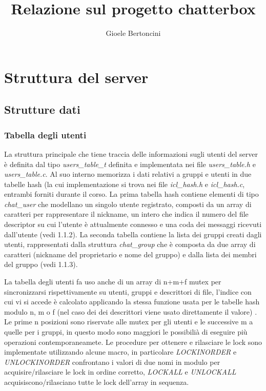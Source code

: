 \documentclass[11pt]{article}
\title{\textbf{Relazione sul progetto chatterbox}}
\author{Gioele Bertoncini}
\date{}
\begin{document}
\maketitle

\section{Struttura del server}
\subsection{Strutture dati}

\subsubsection{Tabella degli utenti}
La struttura principale che tiene traccia delle informazioni sugli utenti del server è definita dal tipo \emph{users\_table\_t} definita e implementata nei file \emph{users\_table.h} e \emph{users\_table.c}. Al suo interno memorizza i dati relativi a gruppi e utenti in due tabelle hash (la cui implementazione si trova nei file \emph{icl\_hash.h} e \emph{icl\_hash.c}, entrambi forniti durante il corso. La prima tabella hash contiene elementi di tipo \emph{chat\_user} che modellano un singolo utente registrato, composti da un array di caratteri per rappresentare il nickname, un intero che indica il numero del file descriptor su cui l'utente è attualmente connesso e una coda dei messaggi ricevuti dall'utente (vedi 1.1.2). La seconda tabella contiene la lista dei gruppi creati dagli utenti, rappresentati dalla struttura \emph{chat\_group} che è composta da due array di caratteri (nickname del proprietario e nome del gruppo) e dalla lista dei membri del gruppo (vedi 1.1.3).

La tabella degli utenti fa uso anche di un array di n+m+f mutex per sincronizzarsi rispettivamente su utenti, gruppi e descrittori di file, l'indice con cui vi si accede è calcolato applicando la stessa funzione usata per le tabelle hash modulo n, m o f (nel caso dei dei descrittori viene usato direttamente il valore) . Le prime n posizioni sono riservate alle mutex per gli utenti e le successive m a quelle per i gruppi, in questo modo sono maggiori le possibilià di eseguire più operazioni contemporaneamete. Le procedure per ottenere e rilasciare le lock sono implementate utilizzando alcune macro, in particolare \emph{LOCKINORDER} e \emph{UNLOCKINORDER} confrontano i valori di due nomi in modulo per acquisire/rilasciare le lock in ordine corretto, \emph{LOCKALL} e \emph{UNLOCKALL} acquisiscono/rilasciano tutte le lock dell'array in sequenza.
\end{document}
